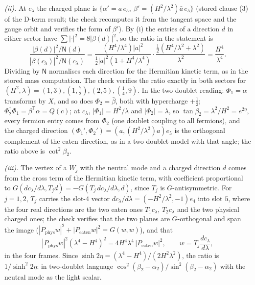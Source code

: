 \emph{(ii).} At $c_{\lambda}$ the charged plane is $\{\alpha' = a\,e_{5},\ \beta' = (H^{2}/\lambda^{2})\bar{a}\,e_{5}\}$ (stored clause (3) of the D-term result; the check recomputes it from the tangent space and the gauge orbit and verifies the form of $\beta'$). By (i) the entries of a direction $d$ in either sector have $\sum|\cdot|^{2} = 8|\beta(d)|^{2}$, so the ratio in the statement is
\[
\frac{|\beta(d)|^{2}/\mathsf{N}(d)}{|\beta(c_{\lambda})|^{2}/\mathsf{N}(c_{\lambda})} = \frac{(H^{4}/\lambda^{4})|a|^{2}}{\tfrac12|a|^{2}(1 + H^{4}/\lambda^{4})}\cdot\frac{\tfrac12(H^{4}/\lambda^{2} + \lambda^{2})}{\lambda^{2}} = \frac{H^{4}}{\lambda^{4}}.
\]
Dividing by $\mathsf{N}$ normalises each direction for the Hermitian kinetic term, as in the stored mass computation. The check verifies the ratio exactly in both sectors for $(H^{2}, \lambda) = (1, 3), (1, \tfrac72), (2, 5), (\tfrac14, 9)$. In the two-doublet reading: $\Phi_{1} = \alpha$ transforms by $X$, and so does $\Phi_{2} = \bar{\beta}$, both with hypercharge $+\tfrac12$; $\Phi_{2}^{\dagger}\Phi_{1} = \beta^{\mathsf T}\alpha = Q(c)$; at $c_{\lambda}$, $|\Phi_{1}| = H^{2}/\lambda$ and $|\Phi_{2}| = \lambda$, so $\tan\beta_{2} = \lambda^{2}/H^{2} = e^{2\eta}$, every fermion entry comes from $\Phi_{2}$ (one doublet coupling to all fermions), and the charged direction $(\Phi_{1}', \Phi_{2}') = (a, (H^{2}/\lambda^{2})a)e_{5}$ is the orthogonal complement of the eaten direction, as in a two-doublet model with that angle; the ratio above is $\cot^{2}\beta_{2}$.

\emph{(iii).} The vertex of a $W_{j}$ with the neutral mode and a charged direction $d$ comes from the cross term of the Hermitian kinetic term, with coefficient proportional to $G(dc_{\lambda}/d\lambda, T_{j}d) = -G(T_{j}\,dc_{\lambda}/d\lambda, d)$, since $T_{j}$ is $G$-antisymmetric. For $j = 1, 2$, $T_{j}$ carries the slot-$4$ vector $dc_{\lambda}/d\lambda = (-H^{2}/\lambda^{2}, -1)e_{4}$ into slot $5$, where the four real directions are the two eaten ones $T_{1}c_{\lambda}$, $T_{2}c_{\lambda}$ and the two physical charged ones; the check verifies that the two planes are $G$-orthogonal and span the image ($|P_{\text{phys}}w|^{2} + |P_{\text{eaten}}w|^{2} = G(w, w)$), and that
\[
|P_{\text{phys}}w|^{2}(\lambda^{4} - H^{4})^{2} = 4H^{4}\lambda^{4}\,|P_{\text{eaten}}w|^{2}, \qquad w = T_{j}\frac{dc_{\lambda}}{d\lambda},
\]
in the four frames. Since $\sinh 2\eta = (\lambda^{4} - H^{4})/(2H^{2}\lambda^{2})$, the ratio is $1/\sinh^{2}2\eta$: in two-doublet language $\cos^{2}(\beta_{2} - \alpha_{2})/\sin^{2}(\beta_{2} - \alpha_{2})$ with the neutral mode as the light scalar.

